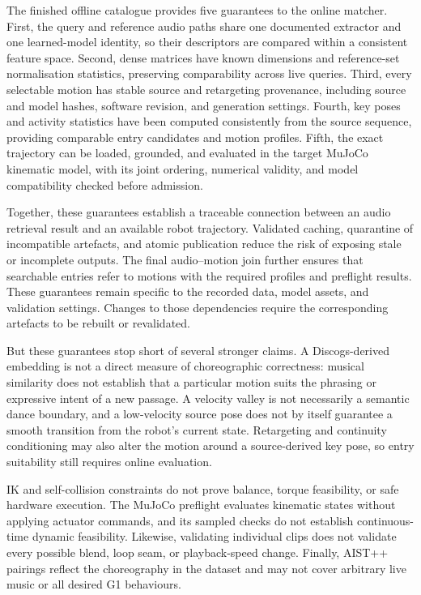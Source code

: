 The finished offline catalogue provides five guarantees to the online matcher.
First, the query and reference audio paths share one documented extractor and
one learned-model identity, so their descriptors are compared within a
consistent feature space. Second, dense matrices have known dimensions and
reference-set normalisation statistics, preserving comparability across live
queries. Third, every selectable motion has stable source and retargeting
provenance, including source and model hashes, software revision, and generation
settings. Fourth, key poses and activity statistics have been computed
consistently from the source sequence, providing comparable entry candidates
and motion profiles. Fifth, the exact trajectory can be loaded, grounded, and
evaluated in the target MuJoCo kinematic model, with its joint ordering,
numerical validity, and model compatibility checked before admission.

Together, these guarantees establish a traceable connection between an audio
retrieval result and an available robot trajectory. Validated caching,
quarantine of incompatible artefacts, and atomic publication reduce the risk
of exposing stale or incomplete outputs. The final audio--motion join further
ensures that searchable entries refer to motions with the required profiles
and preflight results. These guarantees remain specific to the recorded data,
model assets, and validation settings. Changes to those dependencies require
the corresponding artefacts to be rebuilt or revalidated.

But these guarantees stop short of several stronger claims. A
Discogs-derived embedding is not a direct measure of choreographic correctness:
musical similarity does not establish that a particular motion suits the
phrasing or expressive intent of a new passage. A velocity valley is not
necessarily a semantic dance boundary, and a low-velocity source pose does not
by itself guarantee a smooth transition from the robot's current state.
Retargeting and continuity conditioning may also alter the motion around a
source-derived key pose, so entry suitability still requires online evaluation.

IK and self-collision constraints do not prove balance, torque feasibility, or
safe hardware execution. The MuJoCo preflight evaluates kinematic states
without applying actuator commands, and its sampled checks do not establish
continuous-time dynamic feasibility. Likewise, validating individual clips
does not validate every possible blend, loop seam, or playback-speed change.
Finally, AIST++ pairings reflect the choreography in the dataset and may not
cover arbitrary live music or all desired G1 behaviours.

